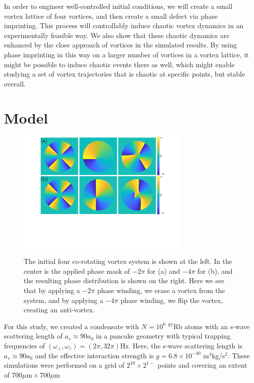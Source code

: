 In order to engineer well-controlled initial conditions, we will create a small vortex lattice of four vortices, and then create a small defect via phase imprinting.
This process will controllably induce chaotic vortex dynamics in an experimentally feasible way.
We also show that these chaotic dynamics are enhanced by the close approach of vortices in the simulated results.
By using phase imprinting in this way on a larger number of vortices in a vortex lattice, it might be possible to induce chaotic events there as well, which might enable studying a set of vortex trajectories that is chaotic at specific points, but stable overall.

\section{Model}

\begin{figure}
\center \includegraphics[width=0.75\textwidth]{data/2d/phase/phase}

\caption{
The initial four co-rotating vortex system is shown at the left.
In the center is the applied phase mask of $-2\pi$ for (a) and $-4\pi$ for (b), and the resulting phase distribution is shown on the right.
Here we see that by applying a $-2\pi$ phase winding, we erase a vortex from the system, and by applying a $-4\pi$ phase winding, we flip the vortex, creating an anti-vortex.
}
\label{fig:phase}
\end{figure}


For this study, we created a condensate with $N = 10^6$ $^{87}$Rb atoms with an s-wave scattering length of $a_s \approx 90a_0$ in a pancake geometry with typical trapping frequencies of $(\omega_\perp, \omega_z) = (2\pi, 32\pi)$Hz.
Here, the s-wave scattering length is $a_s \approx 90a_0$ and the effective interaction strength is $g = 6.8\times 10^{-40}$ m$^4$kg/s$^2$.
These simulations were performed on a grid of $2^{10} \times 2^{1-}$ points and covering an extent of $700\mu \text{m} \times 700 \mu \text{m}$


